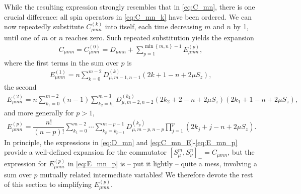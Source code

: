 \documentclass[aps,notitlepage,nofootinbib,11pt]{revtex4-1}
\newcommand{\f}[2]{\dfrac{#1}{#2}} %
\newcommand{\p}[1]{\left(#1\right)} %
\renewcommand{\sp}[1]{\left[#1\right]} %
\renewcommand{\set}[1]{\left\{#1\right\}} %
\newcommand{\1}{\mathds{1}}
\begin{document}
While the resulting expression strongly resembles that in
\eqref{eq:C_mn}, there is one crucial difference: all spin operators
in \eqref{eq:C_mn_k} have been ordered.  We can now repeatedly
substitute $C_{\mu mn}^{(k)}$ into itself, each time decreasing $m$
and $n$ by 1, until one of $m$ or $n$ reaches zero.  Such repeated
substitution yields the expansion
\begin{align}
  C_{\mu mn}
  = C_{\mu mn}^{(0)}
  = D_{\mu mn}
  + \sum_{p=1}^{\min\set{m,n}-1} E_{\mu mn}^{(p)},
  \label{eq:C_mn_E}
\end{align}
where the first terms in the sum over $p$ is
\begin{align}
  E_{\mu mn}^{(1)}
  = n \sum_{k=0}^{m-2} D_{\mu,m-1,n-1}^{(k)}
  \p{2k+1-n+2\mu S_z},
\end{align}
the second
\begin{align}
  E_{\mu mn}^{(2)}
  = n \sum_{k_1=0}^{m-2} \p{n-1} \sum_{k_2=k_1}^{m-3}
  D_{\mu,m-2,n-2}^{(k_2)}
  \p{2k_2+2-n+2\mu S_z} \p{2k_1+1-n+2\mu S_z},
\end{align}
and more generally for $p>1$,
\begin{align}
  E_{\mu mn}^{(p)}
  = \f{n!}{\p{n-p}!}
  \sum_{k_1=0}^{m-2}\cdots\sum_{k_p=k_{p-1}}^{m-p-1}
  D_{\mu,m-p,n-p}^{(k_p)} \prod_{j=1}^p \p{2k_j+j-n+2\mu S_z}.
  \label{eq:E_mn_p}
\end{align}
In principle, the expressions in \eqref{eq:D_mn} and
\eqref{eq:C_mn_E}-\eqref{eq:E_mn_p} provide a well-defined expansion
for the commutator $\sp{S_\mu^m,S_\nu^n}_- = C_{\mu mn}$, but the
expression for $E_{\mu mn}^{(p)}$ in \eqref{eq:E_mn_p} is -- put it
lightly -- quite a mess, involving a sum over $p$ mutually related
intermediate variables!  We therefore devote the rest of this section
to simplifying $E_{\mu mn}^{(p)}$.
\end{document}

